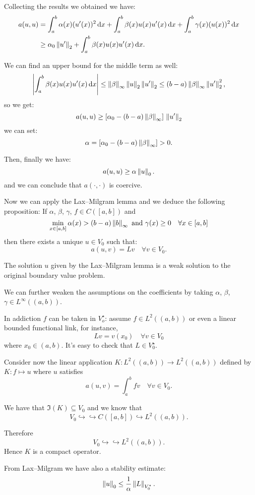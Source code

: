 Collecting the results we obtained we have:
\begin{align*}
	a(u,u)
	&= \int_a^b \alpha(x)(u'(x))^2 \, \mathrm d x
	+ \int_a^b \beta(x)u(x)u'(x) \, \mathrm d x
	+ \int_a^b \gamma(x)(u(x))^2 \, \mathrm d x \\
	& \geq \alpha_0\left\lVert u'\right\rVert_2
	+ \int_a^b \beta(x)u(x)u'(x) \, \mathrm d x.
\end{align*}

We can find an upper bound for the middle term as well:
$$
	\left\lvert\int_a^b \beta(x)u(x)u'(x) \, \mathrm d x\right\rvert
	\leq \left\lVert\beta\right\rVert_\infty \left\lVert u\right\rVert_2 \left\lVert u'\right\rVert_2 
	\leq (b-a) \left\lVert\beta\right\rVert_\infty \left\lVert u'\right\rVert_2^2
	,
	$$
	so we get:
	$$
	a(u,u)
	\geq [\alpha_0 -(b-a)\left\lVert\beta\right\rVert_\infty] \, \left\lVert u'\right\rVert_2
	$$
	we can set:
	$$
	\alpha 
	= [\alpha_0 -(b-a)\left\lVert\beta\right\rVert_\infty]
	> 0
	.
$$

Then, finally we have:
$$
	a(u,u)
	\geq \alpha \left\lVert u\right\rVert_0
	.
$$
and we can conclude that $a(\cdot, \cdot)$ is coercive.

Now we can apply the Lax--Milgram lemma and we deduce the following proposition:
If $\alpha$, $\beta$, $\gamma$, $f \in C([a,b])$ and 
$$
	\min\limits_{x\in[a,b]} \alpha(x)
	> (b-a) \left\lVert b\right\rVert_\infty
	\text{ and }
	\gamma(x) 
	\geq 0
	\quad \forall x \in [a,b]
	$$
	then there exists a unique $u \in V_0$ such that:
	$$
	a(u,v) 
	= Lv \quad \forall v \in V_0
	.
$$

The solution $u$ given by the Lax--Milgram lemma is a weak solution to the original boundary value problem.

We can further weaken the assumptions on the coefficients by taking $\alpha$, $\beta$, $\gamma \in L^\infty((a,b))$.

In addiction $f$ can be taken in $V_o^\star$: assume $f \in L^2((a,b))$ or even a linear bounded functional link, for instance,
$$
	Lv
	= v(x_0)
	\quad \forall v \in V_0
$$
where $x_0 \in (a,b)$. It's easy to check that $L \in V_0^\star$.

Consider now the linear application $K:L^2((a,b)) \to L^2((a,b))$
defined by
$K:f\mapsto u$
where $u$ satisfies
$$
	a(u,v) 
	= \int_a^b fv 
	\quad \forall v \in V_0
	.
$$

We have that $\Im(K) \subseteq V_0$ and we know that 
$$
	V_0
	\hookrightarrow \hookrightarrow C([a,b])
	\hookrightarrow L^2((a,b))
	.
$$

Therefore
$$
	V_0
	\hookrightarrow \hookrightarrow L^2((a,b))
	.
$$
Hence $K$ is a compact operator.

From Lax--Milgram we have also a stability estimate:
$$
	\left\lVert u\right\rVert_0
	\leq \frac 1 \alpha \left\lVert L\right\rVert_{V_0^\star}
	.
$$

